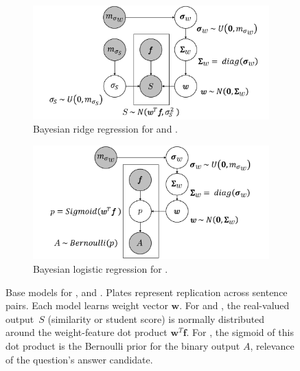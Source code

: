 \begin{figure}[t]
    \centering
    \begin{subfigure}[b]{0.5\textwidth}
        \centering
        \includegraphics[scale=0.35]{2016_naacl_stsdomain/figures/sts_sas_model.pdf}
        \caption{Bayesian ridge regression for \sts{} and \sas{}.}
        \label{figure:sts-sas-model}
    \end{subfigure}
    \newline
    \newline
    \begin{subfigure}[b]{0.5\textwidth}
        \centering
        \includegraphics[scale=0.35]{2016_naacl_stsdomain/figures/asr_model.pdf}
        \caption{Bayesian logistic regression for \asr{}.}
        \label{figure:asr-model}
    \end{subfigure}
    \newline
    \caption{Base models for \sts{}, \sas{} and \asr{}.  Plates represent
      replication across sentence pairs.  Each model learns weight vector
      $\boldsymbol{w}$.  For \sts{} and \sas{}, the real-valued output~$S$
      (similarity or student score) is normally distributed around the
      weight-feature dot product $\boldsymbol{w}^T\boldsymbol{f}$.  For \asr{},
      the sigmoid of this dot product is the Bernoulli prior for the binary
      output $A$, relevance of the question's answer candidate.}
    \label{figure:base-models}

    
    
\end{figure}

